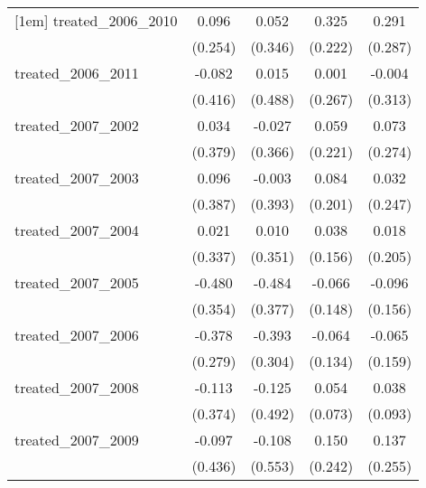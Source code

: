 {\begin{tabular}{l*{4}{c}}
[1em]
treated\_2006\_2010&       0.096         &       0.052         &       0.325         &       0.291         \\
            &     (0.254)         &     (0.346)         &     (0.222)         &     (0.287)         \\
[1em]
treated\_2006\_2011&      -0.082         &       0.015         &       0.001         &      -0.004         \\
            &     (0.416)         &     (0.488)         &     (0.267)         &     (0.313)         \\
[1em]
treated\_2007\_2002&       0.034         &      -0.027         &       0.059         &       0.073         \\
            &     (0.379)         &     (0.366)         &     (0.221)         &     (0.274)         \\
[1em]
treated\_2007\_2003&       0.096         &      -0.003         &       0.084         &       0.032         \\
            &     (0.387)         &     (0.393)         &     (0.201)         &     (0.247)         \\
[1em]
treated\_2007\_2004&       0.021         &       0.010         &       0.038         &       0.018         \\
            &     (0.337)         &     (0.351)         &     (0.156)         &     (0.205)         \\
[1em]
treated\_2007\_2005&      -0.480         &      -0.484         &      -0.066         &      -0.096         \\
            &     (0.354)         &     (0.377)         &     (0.148)         &     (0.156)         \\
[1em]
treated\_2007\_2006&      -0.378         &      -0.393         &      -0.064         &      -0.065         \\
            &     (0.279)         &     (0.304)         &     (0.134)         &     (0.159)         \\
[1em]
treated\_2007\_2008&      -0.113         &      -0.125         &       0.054         &       0.038         \\
            &     (0.374)         &     (0.492)         &     (0.073)         &     (0.093)         \\
[1em]
treated\_2007\_2009&      -0.097         &      -0.108         &       0.150         &       0.137         \\
            &     (0.436)         &     (0.553)         &     (0.242)         &     (0.255)         \\

\end{tabular}}
